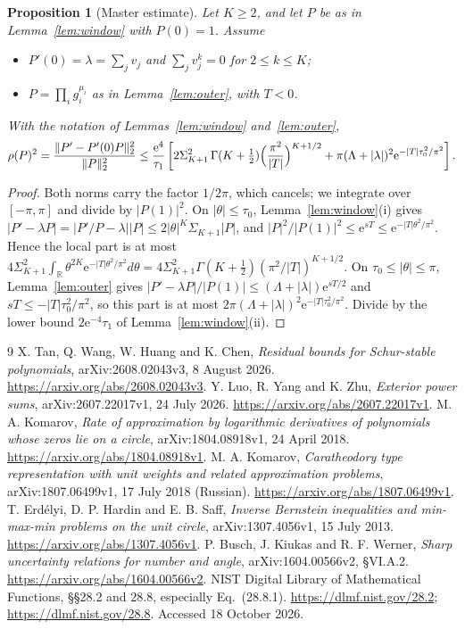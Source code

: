 \documentclass[11pt]{article}
\newtheorem{aprop}[alemma]{Proposition}
\theoremstyle{remark}\newtheorem{remark}[theorem]{Remark}
\newcommand{\norm}[1]{\lVert #1\rVert}
\newcommand{\ee}{\mathrm e}
\begin{document}
\begin{aprop}[Master estimate]\label{prop:master}
Let \(K\ge2\), and let \(P\) be as in Lemma~\ref{lem:window} with
\(P(0)=1\). Assume
\begin{itemize}
\item[(H1)] \(P'(0)=\lambda=\sum_jv_j\) and \(\sum_jv_j^k=0\) for
 \(2\le k\le K\);
\item[(H2)] \(P=\prod_ig_i^{\mu_i}\) as in Lemma~\ref{lem:outer}, with
 \(T<0\).
\end{itemize}
With the notation of Lemmas~\ref{lem:window} and~\ref{lem:outer},
\[
 \rho(P)^2=\frac{\norm{P'-P'(0)P}_2^2}{\norm P_2^2}
 \le\frac{\ee^4}{\tau_1}\left[2\Sigma_{K+1}^2\,
 \Gamma(K+\tfrac12)\Bigl(\frac{\pi^2}{|T|}\Bigr)^{K+1/2}
 +\pi(\Lambda+|\lambda|)^2\ee^{-|T|\tau_0^2/\pi^2}\right].
\]
\end{aprop}
\begin{proof}
Both norms carry the factor \(1/2\pi\), which cancels; we integrate over
\([-\pi,\pi]\) and divide by \(|P(1)|^2\). On
\(|\theta|\le\tau_0\), Lemma~\ref{lem:window}(i) gives
\(|P'-\lambda P|=|P'/P-\lambda||P|\le2|\theta|^K\Sigma_{K+1}|P|\), and
\(|P|^2/|P(1)|^2\le\ee^{sT}\le\ee^{-|T|\theta^2/\pi^2}\). Hence the
local part is at most
\(4\Sigma_{K+1}^2\int_{\mathbb R}\theta^{2K}\ee^{-|T|\theta^2/\pi^2}d\theta
=4\Sigma_{K+1}^2\Gamma(K+\tfrac12)(\pi^2/|T|)^{K+1/2}\).
On \(\tau_0\le|\theta|\le\pi\), Lemma~\ref{lem:outer} gives
\(|P'-\lambda P|/|P(1)|\le(\Lambda+|\lambda|)\ee^{sT/2}\) and
\(sT\le-|T|\tau_0^2/\pi^2\), so this part is at most
\(2\pi(\Lambda+|\lambda|)^2\ee^{-|T|\tau_0^2/\pi^2}\). Divide by the
lower bound \(2\ee^{-4}\tau_1\) of Lemma~\ref{lem:window}(ii).
\end{proof}

\begin{thebibliography}{9}
X. Tan, Q. Wang, W. Huang and K. Chen,
\emph{Residual bounds for Schur-stable polynomials},
arXiv:2608.02043v3, 8 August 2026.
\url{https://arxiv.org/abs/2608.02043v3}.
Y. Luo, R. Yang and K. Zhu,
\emph{Exterior power sums},
arXiv:2607.22017v1, 24 July 2026.
\url{https://arxiv.org/abs/2607.22017v1}.
M. A. Komarov,
\emph{Rate of approximation by logarithmic derivatives of polynomials
whose zeros lie on a circle}, arXiv:1804.08918v1, 24 April 2018.
\url{https://arxiv.org/abs/1804.08918v1}.
M. A. Komarov,
\emph{Caratheodory type representation with unit weights and related
approximation problems}, arXiv:1807.06499v1, 17 July 2018 (Russian).
\url{https://arxiv.org/abs/1807.06499v1}.
T. Erd\'elyi, D. P. Hardin and E. B. Saff,
\emph{Inverse Bernstein inequalities and min-max-min problems on
the unit circle}, arXiv:1307.4056v1, 15 July 2013.
\url{https://arxiv.org/abs/1307.4056v1}.
P. Busch, J. Kiukas and R. F. Werner,
\emph{Sharp uncertainty relations for number and angle},
arXiv:1604.00566v2, \S VI.A.2.
\url{https://arxiv.org/abs/1604.00566v2}.
NIST Digital Library of Mathematical Functions,
\S\S28.2 and 28.8, especially Eq.~(28.8.1).
\url{https://dlmf.nist.gov/28.2}; \url{https://dlmf.nist.gov/28.8}.
Accessed 18 October 2026.
\end{thebibliography}
\end{document}

